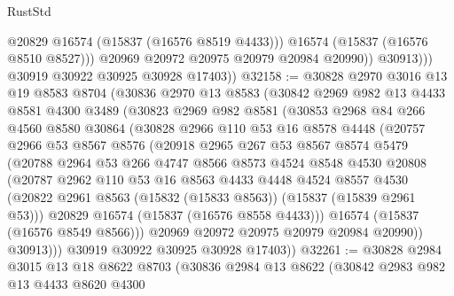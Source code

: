 \begin{lexlean}{RustStd}
\begin{coremodule}
                      @20829
                      @16574
                      (@15837 (@16576 @8519 @4433)))
                    @16574
                    (@15837 (@16576 @8510 @8527)))
                  @20969
                  @20972
                  @20975
                  @20979
                  @20984
                  @20990))
              @30913)))
        @30919
        @30922
        @30925
        @30928
        @17403))
@32158 := @30828
    @2970
    @3016
    @13
    @19
    @8583
    @8704
    (@30836
      @2970
      @13
      @8583
      (@30842
        @2969
        @982
        @13
        @4433
        @8581
        @4300
        @3489
        (@30823
          @2969
          @982
          @8581
          (@30853
            @2968
            @84
            @266
            @4560
            @8580
            @30864
            (@30828
              @2966
              @110
              @53
              @16
              @8578
              @4448
              (@20757
                @2966
                @53
                @8567
                @8576
                (@20918
                  @2965
                  @267
                  @53
                  @8567
                  @8574
                  @5479
                  (@20788
                    @2964
                    @53
                    @266
                    @4747
                    @8566
                    @8573
                    @4524
                    @8548
                    @4530
                    @20808
                    (@20787
                      @2962
                      @110
                      @53
                      @16
                      @8563
                      @4433
                      @4448
                      @4524
                      @8557
                      @4530
                      (@20822 @2961 @8563 (@15832 (@15833 @8563)) (@15837 (@15839 @2961 @53)))
                      @20829
                      @16574
                      (@15837 (@16576 @8558 @4433)))
                    @16574
                    (@15837 (@16576 @8549 @8566)))
                  @20969
                  @20972
                  @20975
                  @20979
                  @20984
                  @20990))
              @30913)))
        @30919
        @30922
        @30925
        @30928
        @17403))
@32261 := @30828
    @2984
    @3015
    @13
    @18
    @8622
    @8703
    (@30836
      @2984
      @13
      @8622
      (@30842
        @2983
        @982
        @13
        @4433
        @8620
        @4300

\end{coremodule}
\end{lexlean}
